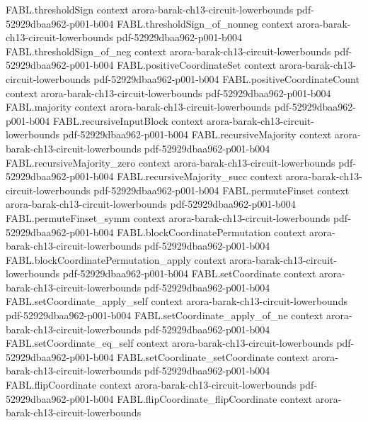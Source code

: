 \begin{theorem}
\proofstep
  {FABL.thresholdSign}
  {context}
  {arora-barak-ch13-circuit-lowerbounds}
  {pdf-52929dbaa962-p001-b004}
\proofstep
  {FABL.thresholdSign_of_nonneg}
  {context}
  {arora-barak-ch13-circuit-lowerbounds}
  {pdf-52929dbaa962-p001-b004}
\proofstep
  {FABL.thresholdSign_of_neg}
  {context}
  {arora-barak-ch13-circuit-lowerbounds}
  {pdf-52929dbaa962-p001-b004}
\proofstep
  {FABL.positiveCoordinateSet}
  {context}
  {arora-barak-ch13-circuit-lowerbounds}
  {pdf-52929dbaa962-p001-b004}
\proofstep
  {FABL.positiveCoordinateCount}
  {context}
  {arora-barak-ch13-circuit-lowerbounds}
  {pdf-52929dbaa962-p001-b004}
\proofstep
  {FABL.majority}
  {context}
  {arora-barak-ch13-circuit-lowerbounds}
  {pdf-52929dbaa962-p001-b004}
\proofstep
  {FABL.recursiveInputBlock}
  {context}
  {arora-barak-ch13-circuit-lowerbounds}
  {pdf-52929dbaa962-p001-b004}
\proofstep
  {FABL.recursiveMajority}
  {context}
  {arora-barak-ch13-circuit-lowerbounds}
  {pdf-52929dbaa962-p001-b004}
\proofstep
  {FABL.recursiveMajority_zero}
  {context}
  {arora-barak-ch13-circuit-lowerbounds}
  {pdf-52929dbaa962-p001-b004}
\proofstep
  {FABL.recursiveMajority_succ}
  {context}
  {arora-barak-ch13-circuit-lowerbounds}
  {pdf-52929dbaa962-p001-b004}
\proofstep
  {FABL.permuteFinset}
  {context}
  {arora-barak-ch13-circuit-lowerbounds}
  {pdf-52929dbaa962-p001-b004}
\proofstep
  {FABL.permuteFinset_symm}
  {context}
  {arora-barak-ch13-circuit-lowerbounds}
  {pdf-52929dbaa962-p001-b004}
\proofstep
  {FABL.blockCoordinatePermutation}
  {context}
  {arora-barak-ch13-circuit-lowerbounds}
  {pdf-52929dbaa962-p001-b004}
\proofstep
  {FABL.blockCoordinatePermutation_apply}
  {context}
  {arora-barak-ch13-circuit-lowerbounds}
  {pdf-52929dbaa962-p001-b004}
\proofstep
  {FABL.setCoordinate}
  {context}
  {arora-barak-ch13-circuit-lowerbounds}
  {pdf-52929dbaa962-p001-b004}
\proofstep
  {FABL.setCoordinate_apply_self}
  {context}
  {arora-barak-ch13-circuit-lowerbounds}
  {pdf-52929dbaa962-p001-b004}
\proofstep
  {FABL.setCoordinate_apply_of_ne}
  {context}
  {arora-barak-ch13-circuit-lowerbounds}
  {pdf-52929dbaa962-p001-b004}
\proofstep
  {FABL.setCoordinate_eq_self}
  {context}
  {arora-barak-ch13-circuit-lowerbounds}
  {pdf-52929dbaa962-p001-b004}
\proofstep
  {FABL.setCoordinate_setCoordinate}
  {context}
  {arora-barak-ch13-circuit-lowerbounds}
  {pdf-52929dbaa962-p001-b004}
\proofstep
  {FABL.flipCoordinate}
  {context}
  {arora-barak-ch13-circuit-lowerbounds}
  {pdf-52929dbaa962-p001-b004}
\proofstep
  {FABL.flipCoordinate_flipCoordinate}
  {context}
  {arora-barak-ch13-circuit-lowerbounds}

\end{theorem}

